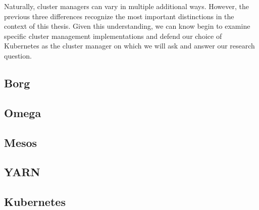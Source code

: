 Naturally, cluster managers can vary in multiple additional ways. However,
the previous three differences recognize the most important distinctions in
the context of this thesis. Given this understanding, we can know begin to examine specific
cluster management implementations and defend our choice of Kubernetes as the
cluster manager on which we will ask and answer our research question.

\subsection{Borg}



\subsection{Omega}





\subsection{Mesos}



\subsection{YARN}



\subsection{Kubernetes}


